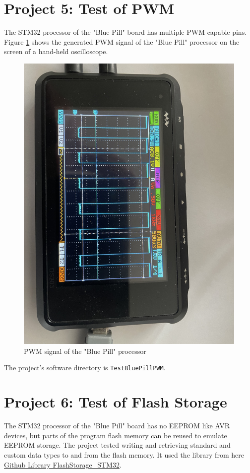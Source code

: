 \documentclass[11pt, oneside]{scrartcl}   	%
\begin{document}
\section{Project 5: Test of PWM}
The STM32 processor of the "Blue Pill" board has multiple PWM capable pins.
Figure \ref{fig:BluePillPWM} shows the generated PWM signal of the "Blue Pill" processor on the screen of a hand-held oscilloscope.
\begin{figure}[htbp]
	\centering
	\includegraphics[width=0.9\linewidth]{Figures/Test_BluePill_PWM.jpeg}
	\caption{PWM signal of the "Blue Pill" processor}
	\label{fig:BluePillPWM}
\end{figure}

The project's software directory is \verb!TestBluePillPWM!.


\section{Project 6: Test of Flash Storage}
The STM32 processor of the "Blue Pill" board has no EEPROM like AVR devices, but parts of the program flash memory can be reused to emulate EEPROM storage.
The project tested writing and retrieving standard and custom data types to and from the flash memory.
It used the library from here \href{https://github.com/khoih-prog/FlashStorage_STM32}{Github Library FlashStorage\_STM32}.
\end{document}
